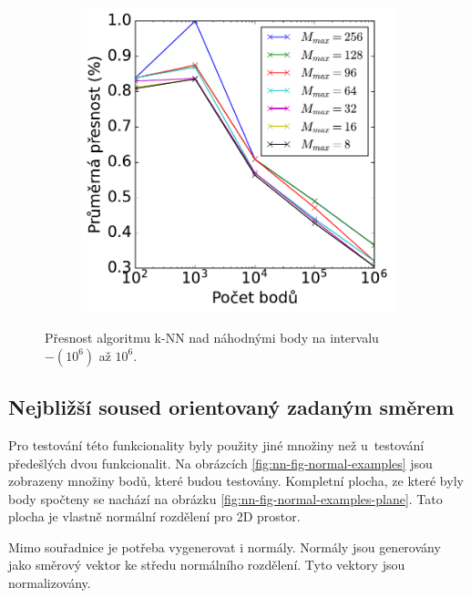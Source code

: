 \begin{figure}
\begin{subfigure}[t]{.5\columnwidth}
\end{subfigure}
\hfill
\begin{subfigure}[t]{.5\columnwidth}
    \centering  
    \includegraphics[scale=0.55]{obrazky-figures/benchmark/knn/benchmark_knn_acc.pdf}

\end{subfigure}
    \caption{Přesnost algoritmu k-NN nad náhodnými body na intervalu $-(10^6)$ až $10^6$. }
\label{fig:knn_accuracy}


\end{figure}

\subsection*{Nejbližší soused orientovaný zadaným směrem}
Pro testování této funkcionality byly použity jiné množiny než u~testování předešlých dvou funkcionalit. Na obrázcích \ref{fig:nn-fig-normal-examples} jsou zobrazeny množiny bodů, které budou testovány. Kompletní plocha, ze které byly body spočteny se nachází na obrázku \ref{fig:nn-fig-normal-examples-plane}. Tato plocha je vlastně normální rozdělení pro 2D prostor. 

Mimo souřadnice je potřeba vygenerovat i normály. Normály jsou generovány jako směrový vektor ke středu normálního rozdělení. Tyto vektory jsou normalizovány. 

